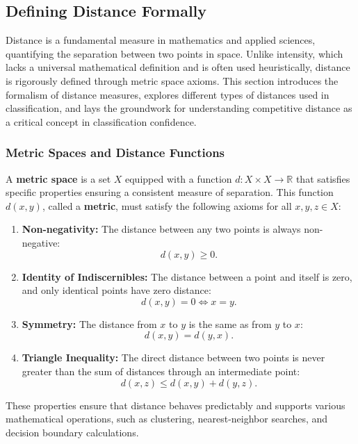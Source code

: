 \subsection{Defining Distance Formally}

Distance is a fundamental measure in mathematics and applied sciences, quantifying the separation between two points in space. Unlike intensity, which lacks a universal mathematical definition and is often used heuristically, distance is rigorously defined through metric space axioms. This section introduces the formalism of distance measures, explores different types of distances used in classification, and lays the groundwork for understanding competitive distance as a critical concept in classification confidence.

\subsubsection{Metric Spaces and Distance Functions}

A \textbf{metric space} is a set \( X \) equipped with a function \( d: X \times X \to \mathbb{R} \) that satisfies specific properties ensuring a consistent measure of separation. This function \( d(x, y) \), called a \textbf{metric}, must satisfy the following axioms for all \( x, y, z \in X \):

\begin{enumerate}
    \item \textbf{Non-negativity:} The distance between any two points is always non-negative:
    \[
    d(x, y) \geq 0.
    \]
    \item \textbf{Identity of Indiscernibles:} The distance between a point and itself is zero, and only identical points have zero distance:
    \[
    d(x, y) = 0 \iff x = y.
    \]
    \item \textbf{Symmetry:} The distance from \( x \) to \( y \) is the same as from \( y \) to \( x \):
    \[
    d(x, y) = d(y, x).
    \]
    \item \textbf{Triangle Inequality:} The direct distance between two points is never greater than the sum of distances through an intermediate point:
    \[
    d(x, z) \leq d(x, y) + d(y, z).
    \]
\end{enumerate}

These properties ensure that distance behaves predictably and supports various mathematical operations, such as clustering, nearest-neighbor searches, and decision boundary calculations.

